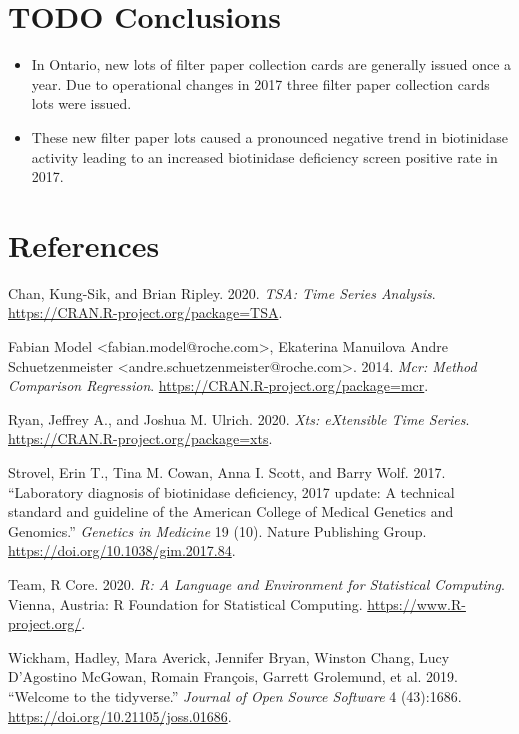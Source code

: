 \documentclass[review]{elsarticle}
\begin{document}
\clearpage

\section*{{\bfseries\sffamily TODO} Conclusions}
\label{sec:org6a00be5}

\begin{itemize}
\item In Ontario, new lots of filter paper collection cards are generally
issued once a year. Due to operational changes in 2017 three filter
paper collection cards lots were issued.
\item These new filter paper lots caused a pronounced negative trend in
biotinidase activity leading to an increased biotinidase deficiency
screen positive rate in 2017.
\end{itemize}

\section*{References}
\label{sec:org09cc79f}
\begin{hangparas}{1.5em}{1}
\hypertarget{citeproc_bib_item_1}{Chan, Kung-Sik, and Brian Ripley. 2020. \textit{TSA: Time Series Analysis}. \href{https://CRAN.R-project.org/package=TSA}{https://CRAN.R-project.org/package=TSA}.}

\hypertarget{citeproc_bib_item_2}{Fabian Model <fabian.model@roche.com>, Ekaterina Manuilova Andre Schuetzenmeister <andre.schuetzenmeister@roche.com>. 2014. \textit{Mcr: Method Comparison Regression}. \href{https://CRAN.R-project.org/package=mcr}{https://CRAN.R-project.org/package=mcr}.}

\hypertarget{citeproc_bib_item_3}{Ryan, Jeffrey A., and Joshua M. Ulrich. 2020. \textit{Xts: eXtensible Time Series}. \href{https://CRAN.R-project.org/package=xts}{https://CRAN.R-project.org/package=xts}.}

\hypertarget{citeproc_bib_item_4}{Strovel, Erin T., Tina M. Cowan, Anna I. Scott, and Barry Wolf. 2017. “Laboratory diagnosis of biotinidase deficiency, 2017 update: A technical standard and guideline of the American College of Medical Genetics and Genomics.” \textit{Genetics in Medicine} 19 (10). Nature Publishing Group. \href{https://doi.org/10.1038/gim.2017.84}{https://doi.org/10.1038/gim.2017.84}.}

\hypertarget{citeproc_bib_item_5}{Team, R Core. 2020. \textit{R: A Language and Environment for Statistical Computing}. Vienna, Austria: R Foundation for Statistical Computing. \href{https://www.R-project.org/}{https://www.R-project.org/}.}

\hypertarget{citeproc_bib_item_6}{Wickham, Hadley, Mara Averick, Jennifer Bryan, Winston Chang, Lucy D’Agostino McGowan, Romain François, Garrett Grolemund, et al. 2019. “Welcome to the tidyverse.” \textit{Journal of Open Source Software} 4 (43):1686. \href{https://doi.org/10.21105/joss.01686}{https://doi.org/10.21105/joss.01686}.}
\end{hangparas}
\end{document}
